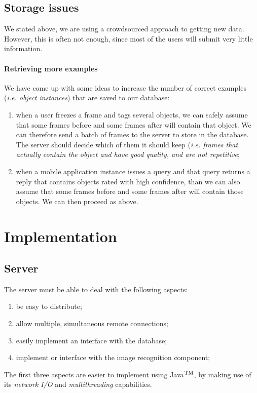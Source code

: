 \documentclass[a4paper,onecolumn,oneside,titlepage,12pt]{report}
\def\tm{\leavevmode\hbox{$\rm {}^{TM}$}}
\begin{document}
\section{Storage issues}

We stated above, we are using a crowdsourced approach to getting new data. However, this is often not enough, since most of the users will submit very little information.

\subsubsection{Retrieving more examples}

We have come up with some ideas to increase the number of correct examples (\emph{i.e. object instances}) that are saved to our database:
\begin{enumerate}
	\item when a user freezes a frame and tags several objects, we can safely assume that some frames before and some frames after will contain that object. We can therefore send a batch of frames to the server to store in the database. The server should decide which of them it should keep (\emph{i.e. frames that actually contain the object and have good quality, and are not repetitive};
	\item when a mobile application instance issues a query and that query returns a reply that contains objects rated with high confidence, than we can also assume that some frames before and some frames after will contain those objects. We can then proceed as above.
\end{enumerate}


\chapter{Implementation}
\section{Server}
The server must be able to deal with the following aspects:
\begin{enumerate}
	\item be easy to distribute;
	\item allow multiple, simultaneous remote connections;
	\item easily implement an interface with the database;
	\item implement or interface with the image recognition component;
\end{enumerate}
The first three aspects are easier to implement using Java\tm, by making use of its \emph{network I/O} and \emph{multithreading} capabilities.
\end{document}
